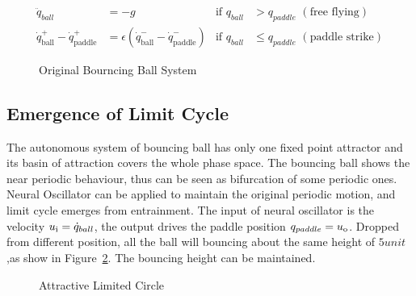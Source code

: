 \begin{align}
\label{eq:bbeq}
\ddot{q}_{ball}&=-g&\mathrm{if}\,\,q_{ball} &> q_{paddle}\,\,\mathrm{(free\,\,flying)} \nonumber\\
\dot{q}^{+}_{\mathrm{ball}} - \dot{q}^{+}_{\mathrm{paddle}} &=  \epsilon(\dot{q}^{-}_{\mathrm{ball}} - \dot{q}^{-}_{\mathrm{paddle}})&\mathrm{if}\,\,q_{ball} &\leq {q_{paddle}}\,\,\mathrm{(paddle\,\,strike)}\nonumber
\end{align}



\begin{figure}[h]
\begin{center}
	
\end{center}
\caption{Original Bourncing Ball System}
\label{fig:bborg}
\end{figure}



\subsection*{Emergence of Limit Cycle}
The autonomous system of bouncing ball has only one fixed point attractor and its basin of attraction covers the whole phase space.
The bouncing ball shows the near periodic behaviour, thus can be seen as bifurcation of some periodic ones.
Neural Oscillator can be applied to maintain the original periodic motion, and limit cycle emerges from entrainment.
The input of neural oscillator is the velocity $u_{\mathrm{i}}=\dot{q}_{ball}$, the output drives the paddle position $q_{paddle}=u_{\mathrm{o}}$.
Dropped from different position, all the ball will bouncing  about the same height of $5 unit$,as show in Figure~\ref{fig:bb_attractive_circle}.
The bouncing height can be maintained.

\begin{figure}[h]
\begin{center}
	
\end{center}
\caption{Attractive Limited Circle}
\label{fig:bb_attractive_circle}
\end{figure}

